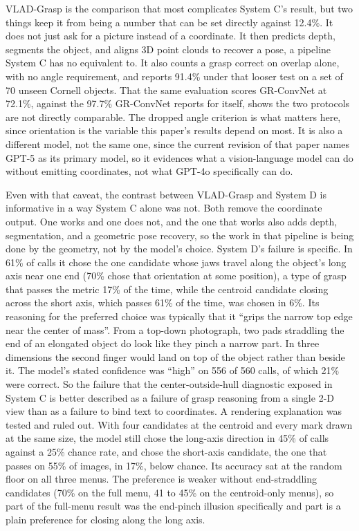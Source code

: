 \documentclass[12pt,letterpaper]{article}
\begin{document}
VLAD-Grasp is the comparison that most complicates System C's result,
but two things keep it from being a number that can be set directly
against 12.4\%. It does not just ask for a picture instead of a
coordinate. It then predicts depth, segments the object, and aligns 3D
point clouds to recover a pose, a pipeline System C has no equivalent
to. It also counts a grasp correct on overlap alone, with no angle
requirement, and reports 91.4\% under that looser test on a set of 70
unseen Cornell objects. That the same evaluation scores GR-ConvNet at
72.1\%, against the 97.7\% GR-ConvNet reports for itself, shows the two
protocols are not directly comparable. The dropped angle criterion is
what matters here, since orientation is the variable this paper's
results depend on most. It is also a different model, not the
same one, since the current revision of that paper names GPT-5 as its
primary model, so it evidences what a vision-language model can do
without emitting coordinates, not what GPT-4o specifically can do.

Even with that caveat, the contrast between VLAD-Grasp and System D
is informative in a way System C alone was not. Both remove the
coordinate output. One works and one does not, and the one that works
also adds depth, segmentation, and a geometric pose recovery, so the
work in that pipeline is being done by the geometry, not by the
model's choice. System D's failure is specific. In 61\% of calls it
chose the one candidate whose jaws travel along the object's long axis
near one end (70\% chose that orientation at some position), a type of
grasp that passes the metric 17\% of the time, while the centroid
candidate closing across the short axis, which passes 61\% of the
time, was chosen in 6\%. Its reasoning for
the preferred choice was typically that it ``grips the narrow top edge
near the center of mass''. From a top-down photograph, two pads
straddling the end of an elongated object do look like they pinch a
narrow part. In three dimensions the second finger would land on top of
the object rather than beside it. The model's stated confidence was
``high'' on 556 of 560 calls, of which 21\% were correct. So the
failure that the center-outside-hull diagnostic exposed in System C is
better described as a failure of grasp reasoning from a single 2-D view
than as a failure to bind text to coordinates. A rendering explanation was
tested and ruled out. With four candidates at the centroid and every
mark drawn at the same size, the model still chose the long-axis
direction in 45\% of calls against a 25\% chance rate, and chose the
short-axis candidate, the one that passes on 55\% of images, in 17\%,
below chance. Its accuracy sat at the random floor on all three menus.
The preference is weaker without end-straddling candidates (70\% on
the full menu, 41 to 45\% on the centroid-only menus), so part of the
full-menu result was the end-pinch illusion specifically and part is a
plain preference for closing along the long axis.
\end{document}
